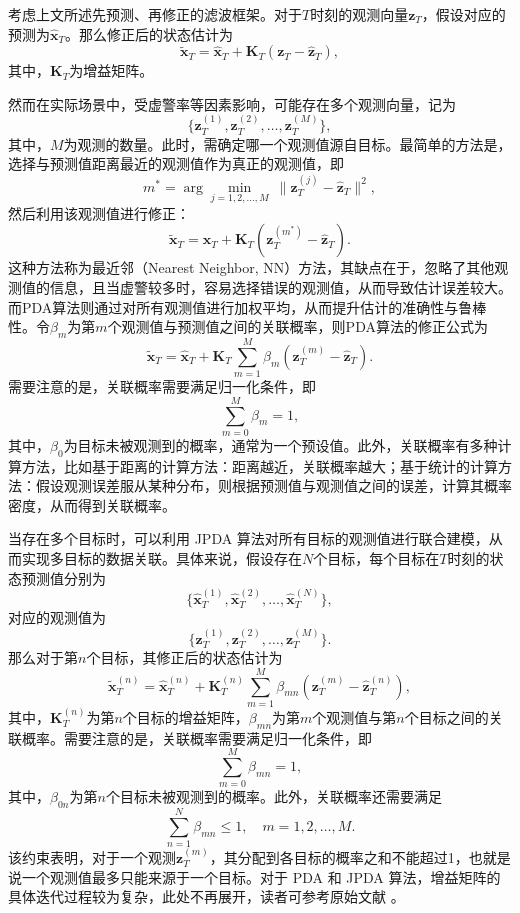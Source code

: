 考虑上文所述先预测、再修正的滤波框架。对于\( T \)时刻的观测向量\( \bm{z}_T \)，假设对应的预测为\( \hat{\bm{x}}_T \)。那么修正后的状态估计为
\[
    \tilde{\bm{x}}_T = \hat{\bm{x}}_T + \mathbf{K}_T (\bm{z}_T - \hat{\bm{z}}_T),
\]
其中，\( \mathbf{K}_T \)为增益矩阵。

然而在实际场景中，受虚警率等因素影响，可能存在多个观测向量，记为
\[
    \{\bm{z}_T^{(1)}, \bm{z}_T^{(2)}, \dots, \bm{z}_T^{(M)}\},
\]
其中，\( M \)为观测的数量。此时，需确定哪一个观测值源自目标。最简单的方法是，选择与预测值距离最近的观测值作为真正的观测值，即
\[
    m^* = \arg\min_{j=1,2,\dots,M} \ \|\bm{z}_T^{(j)} - \hat{\bm{z}}_T\|^2,
\]
然后利用该观测值进行修正：
\[
    \tilde{\bm{x}}_T = \hat{\bm{x}}_T + \mathbf{K}_T (\bm{z}_T^{(m^*)} - \hat{\bm{z}}_T).
\]
这种方法称为最近邻（Nearest Neighbor, NN）方法，其缺点在于，忽略了其他观测值的信息，且当虚警较多时，容易选择错误的观测值，从而导致估计误差较大。而PDA算法则通过对所有观测值进行加权平均，从而提升估计的准确性与鲁棒性。令\( \beta_m \)为第\( m \)个观测值与预测值之间的关联概率，则PDA算法的修正公式为
\[
    \tilde{\bm{x}}_T = \hat{\bm{x}}_T + \mathbf{K}_T \sum_{m=1}^{M} \beta_m (\bm{z}_T^{(m)} - \hat{\bm{z}}_T).
\]
需要注意的是，关联概率需要满足归一化条件，即
\[
    \sum_{m=0}^{M} \beta_m = 1,
\]
其中，\( \beta_0 \)为目标未被观测到的概率，通常为一个预设值。此外，关联概率有多种计算方法，比如基于距离的计算方法：距离越近，关联概率越大；基于统计的计算方法：假设观测误差服从某种分布，则根据预测值与观测值之间的误差，计算其概率密度，从而得到关联概率。

当存在多个目标时，可以利用 JPDA 算法对所有目标的观测值进行联合建模，从而实现多目标的数据关联。具体来说，假设存在\( N \)个目标，每个目标在\( T \)时刻的状态预测值分别为
\[
    \{\hat{\bm{x}}_T^{(1)}, \hat{\bm{x}}_T^{(2)}, \dots, \hat{\bm{x}}_T^{(N)}\},
\]
对应的观测值为
\[
    \{\bm{z}_T^{(1)}, \bm{z}_T^{(2)}, \dots, \bm{z}_T^{(M)}\}.
\]
那么对于第\( n \)个目标，其修正后的状态估计为
\[
    \tilde{\bm{x}}_T^{(n)} = \hat{\bm{x}}_T^{(n)} + \mathbf{K}_T^{(n)} \sum_{m=1}^{M} \beta_{mn} (\bm{z}_T^{(m)} - \hat{\bm{z}}_T^{(n)}),
\]
其中，\( \mathbf{K}_T^{(n)} \)为第\( n \)个目标的增益矩阵，\( \beta_{mn} \)为第\( m \)个观测值与第\( n \)个目标之间的关联概率。需要注意的是，关联概率需要满足归一化条件，即
\[
    \sum_{m=0}^{M} \beta_{mn} = 1,
\]
其中，\( \beta_{0n} \)为第\( n \)个目标未被观测到的概率。此外，关联概率还需要满足
\[
    \sum_{n=1}^{N} \beta_{mn} \leq 1, \quad m = 1,2,\dots,M.
\]
该约束表明，对于一个观测\( \bm{z}_T^{(m)} \)，其分配到各目标的概率之和不能超过1，也就是说一个观测值最多只能来源于一个目标。对于 PDA 和 JPDA 算法，增益矩阵的具体迭代过程较为复杂，此处不再展开，读者可参考原始文献 \cite{4046781,BARSHALOM1975451}。

